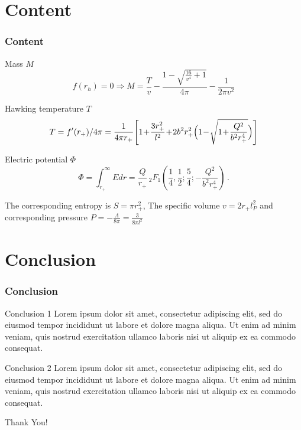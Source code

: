 \section{Content}\label{sec:content}
\begin{frame}
\frametitle{\textbf{Content}}
\begin{block}{Mass $M$}
\begin{equation}
    f(r_h) = 0 \Longrightarrow M = \frac{T}{v}-\frac{1-\sqrt{\frac{16}{v^4}+1}}{4 \pi }-\frac{1}{2 \pi  v^2}
\end{equation}
\end{block}
    
\begin{exampleblock}{Hawking temperature $T$}
\begin{equation}\label{eq:T}
    T = f^{\prime}(r_+) / 4 \pi = \frac{1}{4\pi r_+}\!\left[1\!+\!\frac{3r_+^2}{l^2}\!+\!2b^2 r_+^2\Bigl(1\!-\!\sqrt{1\!+\!\frac{Q^2}{b^2 r_+^4}}\Bigr)\right]
\end{equation}
\end{exampleblock}
    
\begin{alertblock}{Electric potential $\Phi$}
\begin{equation}
    \Phi=\int_{r_+}^\infty E dr
    =\frac{Q}{r_+}\,{}_2 F_1\!\left(\frac{1}{4},\frac{1}{2};\frac{5}{4};-\frac{Q^2}{b^2 r_+^4}\right)\,.
\end{equation}
\end{alertblock}
    
The corresponding entropy is $S = \pi r_+^2$, The specific volume $v = 2 r_+ l_P^2$ and corresponding pressure $P = - \frac{\Lambda}{8 \pi} = \frac{3}{8 \pi l^2}$
\end{frame}

\section{Conclusion}\label{sec:conclusion}
\begin{frame}
\frametitle{Conclusion}
\begin{block}{Conclusion 1}
    Lorem ipsum dolor sit amet, consectetur adipiscing elit, sed do eiusmod tempor incididunt ut labore et dolore magna aliqua.
    Ut enim ad minim veniam, quis nostrud exercitation ullamco laboris nisi ut aliquip ex ea commodo consequat.
\end{block}

\begin{exampleblock}{Conclusion 2}
    Lorem ipsum dolor sit amet, consectetur adipiscing elit, sed do eiusmod tempor incididunt ut labore et dolore magna aliqua.
    Ut enim ad minim veniam, quis nostrud exercitation ullamco laboris nisi ut aliquip ex ea commodo consequat. 
\end{exampleblock}
\end{frame}

\begin{frame}[noframenumbering]
\centering
\fontsize{40}{50}\selectfont Thank You!
\end{frame}

